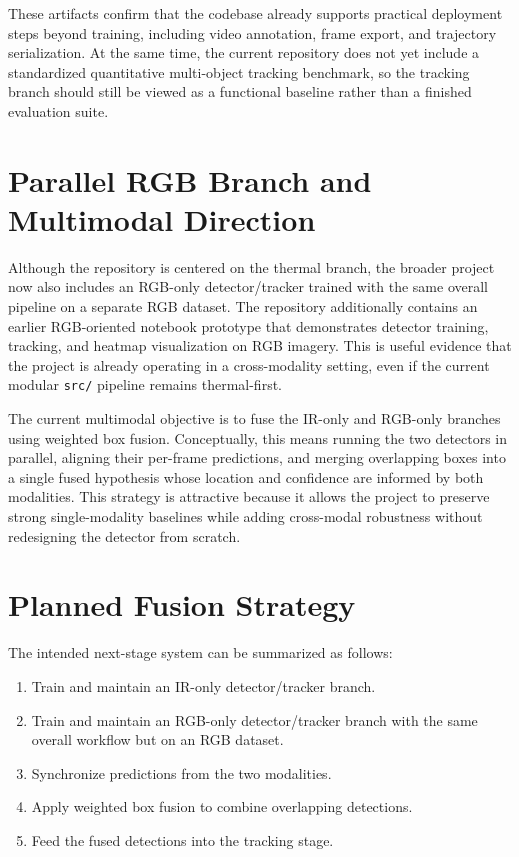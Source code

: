 \documentclass[10pt,conference]{IEEEtran}
\begin{document}
These artifacts confirm that the codebase already supports practical deployment steps beyond training, including video annotation, frame export, and trajectory serialization. At the same time, the current repository does not yet include a standardized quantitative multi-object tracking benchmark, so the tracking branch should still be viewed as a functional baseline rather than a finished evaluation suite.

\section{Parallel RGB Branch and Multimodal Direction}
Although the repository is centered on the thermal branch, the broader project now also includes an RGB-only detector/tracker trained with the same overall pipeline on a separate RGB dataset. The repository additionally contains an earlier RGB-oriented notebook prototype that demonstrates detector training, tracking, and heatmap visualization on RGB imagery. This is useful evidence that the project is already operating in a cross-modality setting, even if the current modular \texttt{src/} pipeline remains thermal-first.

The current multimodal objective is to fuse the IR-only and RGB-only branches using weighted box fusion. Conceptually, this means running the two detectors in parallel, aligning their per-frame predictions, and merging overlapping boxes into a single fused hypothesis whose location and confidence are informed by both modalities. This strategy is attractive because it allows the project to preserve strong single-modality baselines while adding cross-modal robustness without redesigning the detector from scratch.

\section{Planned Fusion Strategy}
The intended next-stage system can be summarized as follows:

\begin{enumerate}[leftmargin=1.5em]
    \item Train and maintain an IR-only detector/tracker branch.
    \item Train and maintain an RGB-only detector/tracker branch with the same overall workflow but on an RGB dataset.
    \item Synchronize predictions from the two modalities.
    \item Apply weighted box fusion to combine overlapping detections.
    \item Feed the fused detections into the tracking stage.
\end{enumerate}
\end{document}
